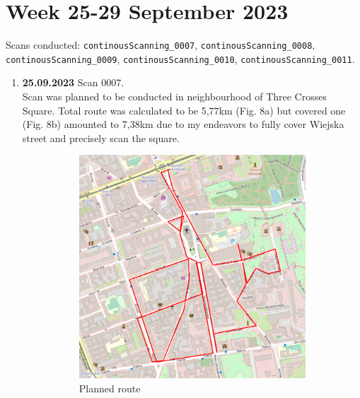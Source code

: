 \documentclass[a4paper,12pt]{article}
\begin{document}
\section{Week 25-29 September 2023} 
Scans conducted: \verb|continousScanning_0007|, \verb|continousScanning_0008|, \verb|continousScanning_0009|, \verb|continousScanning_0010|, \verb|continousScanning_0011|.\\
\begin{enumerate}
	\item \textbf{25.09.2023} Scan 0007. \\
	Scan was planned to be conducted in neighbourhood of Three Crosses Square. Total route was calculated to be 5,77km (Fig. 8a) but covered one (Fig. 8b) amounted to 7,38km due to my endeavors to fully cover Wiejska street and precisely scan the square.
	\begin{figure}[H]
		\centering
		\begin{subfigure}{.75\textwidth}
			\centering
			\includegraphics[width=1\linewidth]{route_p7}
			\caption{Planned route}
			\label{fig:a7}
		\end{subfigure}%
		\linebreak
		\begin{subfigure}{.75\textwidth}
			\centering

\end{subfigure}
\end{figure}
\end{enumerate}
\end{document}
